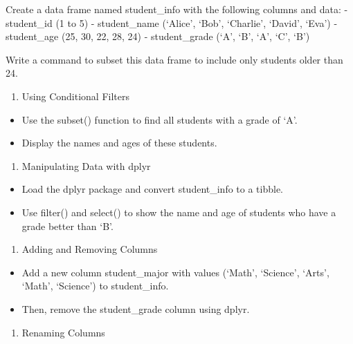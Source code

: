 \documentclass[
]{book}
\providecommand{\tightlist}{%
  \setlength{\itemsep}{0pt}\setlength{\parskip}{0pt}}
\begin{document}
Create a data frame named student\_info with the following columns and data:
- student\_id (1 to 5)
- student\_name (`Alice', `Bob', `Charlie', `David', `Eva')
- student\_age (25, 30, 22, 28, 24)
- student\_grade (`A', `B', `A', `C', `B')

Write a command to subset this data frame to include only students older than 24.

\begin{enumerate}
\def\labelenumi{\arabic{enumi}.}
\setcounter{enumi}{1}
\tightlist
\item
  Using Conditional Filters
\end{enumerate}

\begin{itemize}
\tightlist
\item
  Use the subset() function to find all students with a grade of `A'.
\item
  Display the names and ages of these students.
\end{itemize}

\begin{enumerate}
\def\labelenumi{\arabic{enumi}.}
\setcounter{enumi}{2}
\tightlist
\item
  Manipulating Data with dplyr
\end{enumerate}

\begin{itemize}
\item
  Load the dplyr package and convert student\_info to a tibble.
\item
  Use filter() and select() to show the name and age of students who have a grade better than `B'.
\end{itemize}

\begin{enumerate}
\def\labelenumi{\arabic{enumi}.}
\setcounter{enumi}{3}
\tightlist
\item
  Adding and Removing Columns
\end{enumerate}

\begin{itemize}
\tightlist
\item
  Add a new column student\_major with values (`Math', `Science', `Arts', `Math', `Science') to student\_info.
\item
  Then, remove the student\_grade column using dplyr.
\end{itemize}

\begin{enumerate}
\def\labelenumi{\arabic{enumi}.}
\setcounter{enumi}{4}
\tightlist
\item
  Renaming Columns
\end{enumerate}
\end{document}
